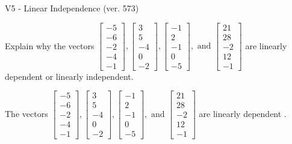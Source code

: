 \begin{exercise}
  \begin{exerciseTitle}V5 - Linear Independence (ver. 573)\end{exerciseTitle}
  \begin{exerciseStatement}
    Explain why the vectors \(\left[\begin{array}{r}
-5 \\
-6 \\
-2 \\
-4 \\
-1
\end{array}\right] , \left[\begin{array}{r}
3 \\
5 \\
-4 \\
0 \\
-2
\end{array}\right] , \left[\begin{array}{r}
-1 \\
2 \\
-1 \\
0 \\
-5
\end{array}\right] , \text{ and } \left[\begin{array}{r}
21 \\
28 \\
-2 \\
12 \\
-1
\end{array}\right]\) are linearly dependent or linearly independent.	


  \end{exerciseStatement}
  \begin{exerciseAnswer}
   The vectors \(\left[\begin{array}{r}
-5 \\
-6 \\
-2 \\
-4 \\
-1
\end{array}\right] , \left[\begin{array}{r}
3 \\
5 \\
-4 \\
0 \\
-2
\end{array}\right] , \left[\begin{array}{r}
-1 \\
2 \\
-1 \\
0 \\
-5
\end{array}\right] , \text{ and } \left[\begin{array}{r}
21 \\
28 \\
-2 \\
12 \\
-1
\end{array}\right]\) are 
  	 linearly dependent  .
  


  \end{exerciseAnswer}
\end{exercise}